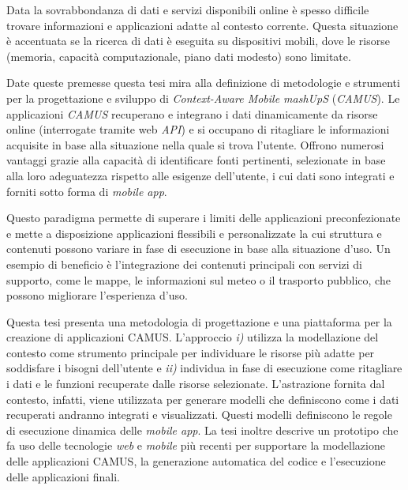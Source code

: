 Data la sovrabbondanza di dati e servizi disponibili online è spesso difficile trovare informazioni e applicazioni adatte al contesto corrente. Questa situazione è accentuata se la ricerca di dati è eseguita su dispositivi mobili, dove le risorse (memoria, capacità computazionale, piano dati modesto) sono limitate.

Date queste premesse questa tesi mira alla definizione di metodologie e strumenti per la progettazione e sviluppo di \emph{Context-Aware Mobile mashUpS} (\emph{CAMUS}). Le applicazioni \emph{CAMUS} recuperano e integrano i dati dinamicamente da risorse online (interrogate tramite web \emph{API}) e si occupano di ritagliare le informazioni acquisite in base alla situazione nella quale si trova l'utente. Offrono numerosi vantaggi grazie alla capacità di identificare fonti pertinenti, selezionate in base alla loro adeguatezza rispetto alle esigenze dell'utente, i cui dati sono integrati e forniti sotto forma di \emph{mobile app}.

Questo paradigma permette di superare i limiti delle applicazioni preconfezionate e mette a disposizione applicazioni flessibili e personalizzate la cui struttura e contenuti possono variare in fase di esecuzione in base alla situazione d'uso. Un esempio di beneficio è l'integrazione dei contenuti principali con servizi di supporto, come le mappe, le informazioni sul meteo o il trasporto pubblico, che possono migliorare l'esperienza d'uso.

Questa tesi presenta una metodologia di progettazione e una piattaforma per la creazione di applicazioni CAMUS. L'approccio \emph{i)} utilizza la modellazione del contesto come strumento principale per individuare le risorse più adatte per soddisfare i bisogni dell'utente e \emph{ii)} individua in fase di esecuzione come ritagliare i dati e le funzioni recuperate dalle risorse selezionate. L'astrazione fornita dal contesto, infatti, viene utilizzata per generare modelli che definiscono come i dati recuperati andranno integrati e visualizzati. Questi modelli definiscono le regole di esecuzione dinamica delle \emph{mobile app}. La tesi inoltre descrive un prototipo che fa uso delle tecnologie \emph{web} e \emph{mobile} più recenti per supportare la modellazione delle applicazioni CAMUS, la generazione automatica del codice e l'esecuzione delle applicazioni finali.